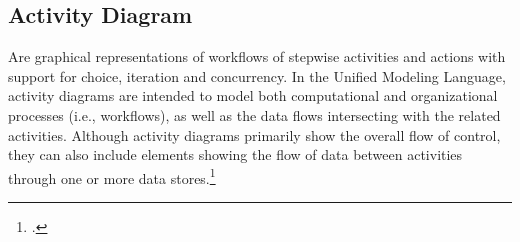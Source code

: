 












\clearpage
\subsection{Activity Diagram}
Are graphical representations of workflows of stepwise activities and actions with support for choice, iteration and concurrency. In the Unified Modeling Language, activity diagrams are intended to model both computational and organizational processes (i.e., workflows), as well as the data flows intersecting with the related activities. Although activity diagrams primarily show the overall flow of control, they can also include elements showing the flow of data between activities through one or more data stores.\footcite{wikiactivitydiagram}

